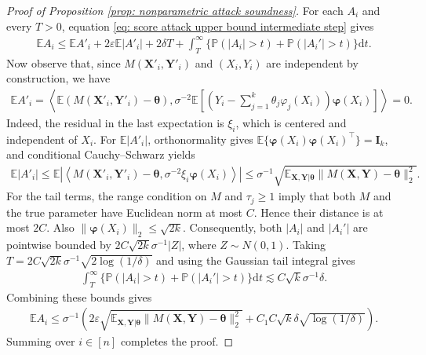 \documentclass[letterpaper,12pt]{article}
\renewcommand{\d}{\mathrm{d}}
\numberwithin{equation}{section}
\theoremstyle{plain}
\numberwithin{Theorem}{section}
\numberwithin{proposition}{section}
\numberwithin{Lemma}{section}
{
	\theoremstyle{definition}
	\newtheorem{Definition}{Definition}
	\newtheorem{example}{Example}
	\numberwithin{example}{section}
	\newtheorem{fact}{Fact}
	\numberwithin{fact}{section}
	\newtheorem{remark}{Remark}
}
\newcommand{\rev}[1]{#1}
\newcommand{\Pro}{\mathbb{P}}
\newcommand{\1}{\mathbbm{1}}
\def\bth{{\boldsymbol{\theta}}}
\def\E{\mathbb{E}}
\begin{document}
\begin{proof}[Proof of Proposition \ref{prop: nonparametric attack soundness}]
		For each $A_{i}$ and every $T > 0$, equation \eqref{eq: score attack upper bound intermediate step} gives
		\begin{align*}
			\E A_{i} \leq \E A'_{i} + 2\varepsilon\E|A'_{i}| + 2 \delta T
			+ \int_T^\infty \{\Pro(|A_{i}| > t)+\Pro(|A_i'|>t)\} \d t.
		\end{align*}
	Now observe that, since $M(\bm X'_i, \bm Y'_{i})$ and $(X_i, Y_i)$ are independent by construction, we have
	\begin{align*}
			\E A'_{i} = \left\langle \E \left(M(\bm X'_i, \bm Y'_{i}) - \bth\right),
			\sigma^{-2}\E\left[\left(Y_i - \sum_{j=1}^k \theta_j\varphi_j(X_i)\right)\bm\varphi(X_i)\right] \right\rangle = 0.
		\end{align*}
		Indeed, the residual in the last expectation is $\xi_i$, which is centered and independent of $X_i$. For $\E|A'_i|$, orthonormality gives $\E\{\bm\varphi(X_i) \bm\varphi(X_i)^\top\} = \bm I_k$, and conditional Cauchy--Schwarz yields
	\begin{align*}
		\E |A'_i| \leq \E \left|\left\langle M(\bm X'_i, \bm Y'_i) - \bth,  \sigma^{-2}\xi_i\bm\varphi(X_i)\right\rangle\right| \leq \sigma^{-1} \sqrt{\E_{\bm X, \bm Y|\bth} \|M(\bm X, \bm Y) - \bth\|_2^2}.
	\end{align*} 
		{For the tail terms, the range condition on $M$ and $\tau_j\geq1$ imply that both $M$ and the true parameter have Euclidean norm at most $C$. Hence their distance is at most $2C$. Also $\|\bm \varphi(X_i)\|_2 \leq \sqrt{2k}$. Consequently, both $|A_i|$ and $|A_i'|$ are pointwise bounded by $2C\sqrt{2k}\sigma^{-1}|Z|$, where $Z\sim N(0,1)$. Taking $T=2C\sqrt{2k}\sigma^{-1}\sqrt{2\log(1/\delta)}$ and using the Gaussian tail integral gives}
		\begin{align*}
			\rev{\int_T^\infty \{\Pro(|A_{i}| > t)+\Pro(|A_i'|>t)\} \d t
			\lesssim C\sqrt{k}\sigma^{-1}\delta.}
		\end{align*}
			Combining these bounds gives
		\begin{align*}
		\E A_i \leq \sigma^{-1}\left(2\varepsilon\sqrt{\E_{\bm X, \bm Y|\bth} \|M(\bm X, \bm Y) - \bth\|_2^2} + C_1C\sqrt{k}\delta\sqrt{\log(1/\delta)}\right).
		\end{align*}
	Summing over $i \in [n]$ completes the proof.
\end{proof}
\end{document}
